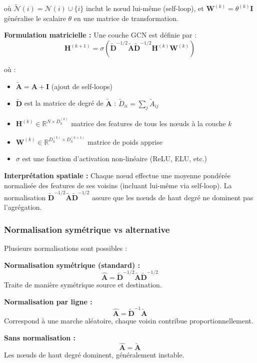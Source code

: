 où $\tilde{\mathcal{N}}(i) = \mathcal{N}(i) \cup \{i\}$ inclut le nœud lui-même (self-loop), et $\mathbf{W}^{(k)} = \theta^{(k)} \mathbf{I}$ généralise le scalaire $\theta$ en une matrice de transformation.

\textbf{Formulation matricielle :}
Une couche GCN est définie par :
\[
\mathbf{H}^{(k+1)} = \sigma\left(\tilde{\mathbf{D}}^{-1/2}\tilde{\mathbf{A}}\tilde{\mathbf{D}}^{-1/2}\mathbf{H}^{(k)}\mathbf{W}^{(k)}\right)
\]

où :
\begin{itemize}
    \item $\tilde{\mathbf{A}} = \mathbf{A} + \mathbf{I}$ (ajout de self-loops)
    \item $\tilde{\mathbf{D}}$ est la matrice de degré de $\tilde{\mathbf{A}}$ : $\tilde{D}_{ii} = \sum_j \tilde{A}_{ij}$
    \item $\mathbf{H}^{(k)} \in \mathbb{R}^{N \times D_h^{(k)}}$ matrice des features de tous les nœuds à la couche $k$
    \item $\mathbf{W}^{(k)} \in \mathbb{R}^{D_h^{(k)} \times D_h^{(k+1)}}$ matrice de poids apprise
    \item $\sigma$ est une fonction d'activation non-linéaire (ReLU, ELU, etc.)
\end{itemize}

\textbf{Interprétation spatiale :}
Chaque nœud effectue une moyenne pondérée normalisée des features de ses voisins (incluant lui-même via self-loop). La normalisation $\tilde{\mathbf{D}}^{-1/2}\tilde{\mathbf{A}}\tilde{\mathbf{D}}^{-1/2}$ assure que les nœuds de haut degré ne dominent pas l'agrégation.

\subsubsection{Normalisation symétrique vs alternative}

Plusieurs normalisations sont possibles :

\textbf{Normalisation symétrique (standard) :}
\[
\hat{\mathbf{A}} = \tilde{\mathbf{D}}^{-1/2}\tilde{\mathbf{A}}\tilde{\mathbf{D}}^{-1/2}
\]
Traite de manière symétrique source et destination.

\textbf{Normalisation par ligne :}
\[
\hat{\mathbf{A}} = \tilde{\mathbf{D}}^{-1}\tilde{\mathbf{A}}
\]
Correspond à une marche aléatoire, chaque voisin contribue proportionnellement.

\textbf{Sans normalisation :}
\[
\hat{\mathbf{A}} = \tilde{\mathbf{A}}
\]
Les nœuds de haut degré dominent, généralement instable.


